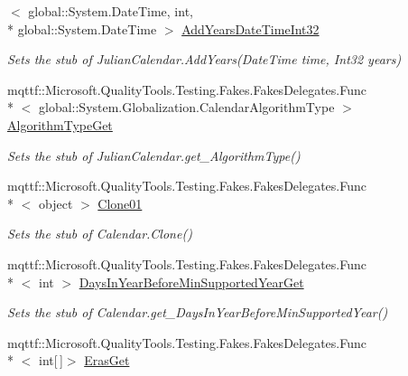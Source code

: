 \begin{DoxyCompactItemize}
$<$ global\-::\-System.\-Date\-Time, int, \\*
global\-::\-System.\-Date\-Time $>$ \hyperlink{class_system_1_1_globalization_1_1_fakes_1_1_stub_julian_calendar_acf3e4c0374f7a40b07074700b34e052f}{Add\-Years\-Date\-Time\-Int32}
\begin{DoxyCompactList}\small\item\em Sets the stub of Julian\-Calendar.\-Add\-Years(\-Date\-Time time, Int32 years)\end{DoxyCompactList}\item 
mqttf\-::\-Microsoft.\-Quality\-Tools.\-Testing.\-Fakes.\-Fakes\-Delegates.\-Func\\*
$<$ global\-::\-System.\-Globalization.\-Calendar\-Algorithm\-Type $>$ \hyperlink{class_system_1_1_globalization_1_1_fakes_1_1_stub_julian_calendar_a1883a1d193e04bd90ecfe93b384a8fe1}{Algorithm\-Type\-Get}
\begin{DoxyCompactList}\small\item\em Sets the stub of Julian\-Calendar.\-get\-\_\-\-Algorithm\-Type()\end{DoxyCompactList}\item 
mqttf\-::\-Microsoft.\-Quality\-Tools.\-Testing.\-Fakes.\-Fakes\-Delegates.\-Func\\*
$<$ object $>$ \hyperlink{class_system_1_1_globalization_1_1_fakes_1_1_stub_julian_calendar_acc618ea81cd9980bbd2129be73be4851}{Clone01}
\begin{DoxyCompactList}\small\item\em Sets the stub of Calendar.\-Clone()\end{DoxyCompactList}\item 
mqttf\-::\-Microsoft.\-Quality\-Tools.\-Testing.\-Fakes.\-Fakes\-Delegates.\-Func\\*
$<$ int $>$ \hyperlink{class_system_1_1_globalization_1_1_fakes_1_1_stub_julian_calendar_adb1db643c9b905df0425df1bf6ac51de}{Days\-In\-Year\-Before\-Min\-Supported\-Year\-Get}
\begin{DoxyCompactList}\small\item\em Sets the stub of Calendar.\-get\-\_\-\-Days\-In\-Year\-Before\-Min\-Supported\-Year()\end{DoxyCompactList}\item 
mqttf\-::\-Microsoft.\-Quality\-Tools.\-Testing.\-Fakes.\-Fakes\-Delegates.\-Func\\*
$<$ int\mbox{[}$\,$\mbox{]}$>$ \hyperlink{class_system_1_1_globalization_1_1_fakes_1_1_stub_julian_calendar_ad87a13f96872b6c28c87d7ae44f21ca0}{Eras\-Get}

\end{DoxyCompactItemize}
